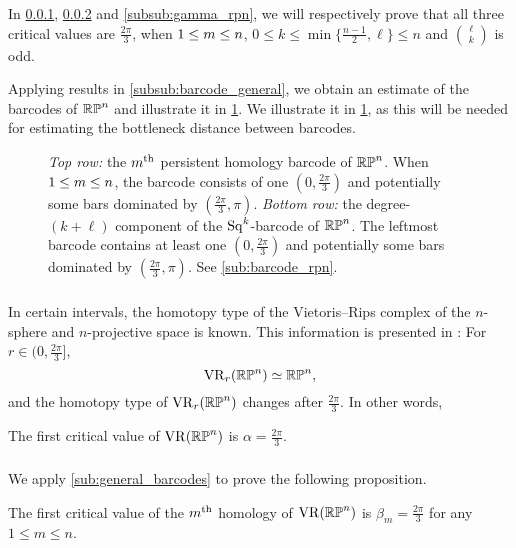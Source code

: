 In \cref{subsub:rpn homotopy type}, \cref{subsub:beta_m_rpn} and \cref{subsub:gamma_rpn}, we will respectively prove that all three critical values are $\frac{2\pi}{3}$, when $1 \leq m \leq n$, $0 \leq k \leq \min\{\frac{n-1}{2}, \ell\} \leq n$ and $\binom{\ell}{k}$ is odd.

Applying results in \cref{subsub:barcode_general}, we obtain an estimate of the barcodes of $\mathbb{RP}^n$ and illustrate it in \cref{fig:sq barcodes}.
We illustrate it in \cref{fig:sq barcodes}, as this will be needed for estimating the bottleneck distance between barcodes.

\begin{figure}
	\centering
	
	\caption{\emph{Top row:} the $m^{\mathrm{th}}$ persistent homology barcode of $\mathbb{RP}^n$.
		When $1\leq m \leq n$, the barcode consists of one $(0,\frac{2\pi}{3})$ and potentially some bars dominated by $(\frac{2\pi}{3}, \pi)$.
		\emph{Bottom row:} the degree-$(k+\ell)$ component of the $\operatorname{Sq}^k$-barcode of $\mathbb{RP}^n$.
		The leftmost barcode contains at least one $(0,\frac{2\pi}{3})$ and potentially some bars dominated by $(\frac{2\pi}{3}, \pi)$.
		See \cref{sub:barcode_rpn}.
	}
	\label{fig:sq barcodes}
\end{figure}

\subsubsection{}
\label{subsub:rpn homotopy type}

In certain intervals, the homotopy type of the Vietoris--Rips complex of the $n$-sphere and $n$-projective space is known.
This information is presented in \cite[Thm.~4.5]{adams2022metric}:
For $r \in (0,\frac{2\pi}{3} ]$,
\[
\operatorname{VR}_r(\mathbb{RP}^n) \simeq \mathbb{RP}^n,
\]
and the homotopy type of $\operatorname{VR}_r(\mathbb{RP}^n)$ changes after $\tfrac{2\pi}{3}$.
In other words,

\medskip\proposition
The first critical value of \(\operatorname{VR}(\mathbb{RP}^n)\) is \(\alpha = \frac{2\pi}{3}\).

\subsubsection{}
\label{subsub:beta_m_rpn}

We apply \cref{sub:general_barcodes} to prove the following proposition.

\medskip\proposition
The first critical value of the $m^{\mathrm{th}}$ homology of $\operatorname{VR}(\mathbb{RP}^n)$ is $\beta_m=\frac{2\pi}{3}$ for any $1\leq m\leq n$.

